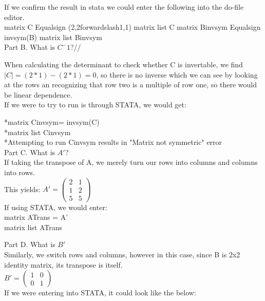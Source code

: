 \documentclass[11pt]{article}
\begin{document}
If we confirm the result in stata we could enter the following into the do-file editor.\\

matrix C Equalsign (2,2forwardslash1,1)
matrix list C
matrix Binvsym Equalsign invsym(B)
matrix list Binvsym\\

Part B. What is $C^-1$?//

When calculating the determinant to check whether C is invertable, we find $|C|= (2*1)-(2*1)=0$, so there is no inverse which we can see by looking at the rows an recognizing that row two is a multiple of row one, so there would be linear dependence.\\

If we were to try to run is through STATA, we would get:

*matrix Cinvsym= invsym(C)\\
*matrix list Cinvsym\\
*Attempting to run Cinvsym results in "Matrix not symmetric" error \\

Part C. What is $A'$?\\

If taking the transpose of A, we merely turn our rows into columns and columns into rows.\\

This yields: $A' = \left( \begin{smallmatrix} 2&1\\1&2\\5&5 \end{smallmatrix} \right)$\\

If using STATA, we would enter:\\

matrix ATrans = A'\\
matrix list ATrans

Part D. What is $B'$\\

Similarly, we switch rows and columns, however in this case, since B is 2x2 identity matrix, its transpose is itself.\\

$B' = \left( \begin{smallmatrix} 1&0\\0&1 \end{smallmatrix} \right)$\\

If we were entering into STATA, it could look like the below:\\
\end{document}
